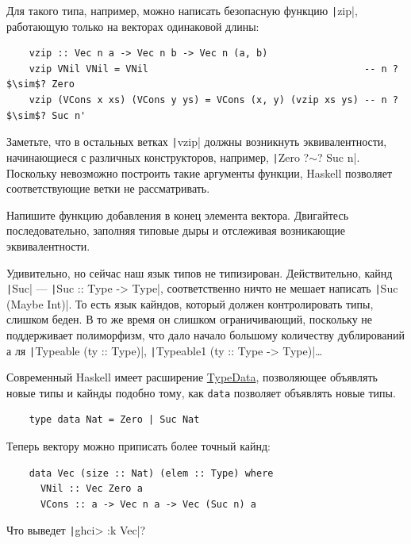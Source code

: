 Для такого типа, например, можно написать безопасную функцию \texttt|zip|, работающую только на векторах одинаковой длины:
\begin{verbatim}
    vzip :: Vec n a -> Vec n b -> Vec n (a, b)
    vzip VNil VNil = VNil                                      -- n ?$\sim$? Zero
    vzip (VCons x xs) (VCons y ys) = VCons (x, y) (vzip xs ys) -- n ?$\sim$? Suc n'
\end{verbatim}

Заметьте, что в остальных ветках \texttt|vzip| должны возникнуть эквивалентности, начинающиеся с различных конструкторов, например, \texttt|Zero ?$\sim$? Suc n|.
Поскольку невозможно построить такие аргументы функции, Haskell позволяет соответствующие ветки не рассматривать.

\begin{task}
    Напишите функцию добавления в конец элемента вектора.
    Двигайтесь последовательно, заполняя типовые дыры и отслеживая возникающие эквивалентности.
\end{task}

Удивительно, но сейчас наш язык типов не типизирован.
Действительно, кайнд \texttt|Suc| --- \texttt|Suc :: Type -> Type|, соответственно ничто не мешает написать \texttt|Suc (Maybe Int)|.
То есть язык кайндов, который должен контролировать типы, слишком беден.
В то же время он слишком ограничивающий, поскольку не поддерживает полиморфизм, что дало начало большому количеству дублирований а ля \texttt|Typeable (ty :: Type)|, \texttt|Typeable1 (ty :: Type -> Type)|\ldots

Современный Haskell имеет расширение \href{https://downloads.haskell.org/ghc/latest/docs/users_guide/exts/type_data.html#extension-TypeData}{TypeData}, позволяющее объявлять новые типы и кайнды подобно тому, как \texttt{data} позволяет объявлять новые типы.
\begin{verbatim}
    type data Nat = Zero | Suc Nat
\end{verbatim}

Теперь вектору можно приписать более точный кайнд:
\begin{verbatim}
    data Vec (size :: Nat) (elem :: Type) where
      VNil :: Vec Zero a
      VCons :: a -> Vec n a -> Vec (Suc n) a
\end{verbatim}

\begin{task}
    Что выведет \texttt|ghci> :k Vec|?
\end{task}

